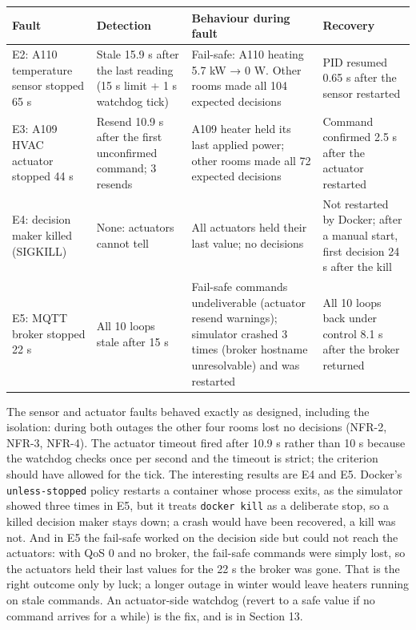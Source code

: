 \documentclass[11pt]{article}
\makeatletter
\DeclareRobustCommand{\_}{\ifmmode\nfss@text{\textunderscore}\else\textunderscore\allowbreak\fi}
\makeatother
\begin{document}
\begin{longtable}[]{@{}
  >{\raggedright\arraybackslash}p{}
  >{\raggedright\arraybackslash}p{}
  >{\raggedright\arraybackslash}p{}
  >{\raggedright\arraybackslash}p{}@{}}
\toprule
\textbf{Fault} & \textbf{Detection} & \textbf{Behaviour during fault} & \textbf{Recovery} \\
\midrule
\endhead
E2: A110 temperature sensor stopped 65 s & Stale 15.9 s after the last reading (15 s limit + 1 s watchdog tick) & Fail-safe: A110 heating 5.7 kW → 0 W. Other rooms made all 104 expected decisions & PID resumed 0.65 s after the sensor restarted \\
E3: A109 HVAC actuator stopped 44 s & Resend 10.9 s after the first unconfirmed command; 3 resends & A109 heater held its last applied power; other rooms made all 72 expected decisions & Command confirmed 2.5 s after the actuator restarted \\
E4: decision maker killed (SIGKILL) & None: actuators cannot tell & All actuators held their last value; no decisions & Not restarted by Docker; after a manual start, first decision 24 s after the kill \\
E5: MQTT broker stopped 22 s & All 10 loops stale after 15 s & Fail-safe commands undeliverable (actuator resend warnings); simulator crashed 3 times (broker hostname unresolvable) and was restarted & All 10 loops back under control 8.1 s after the broker returned \\
\bottomrule
\end{longtable}

The sensor and actuator faults behaved exactly as designed, including the
isolation: during both outages the other four rooms lost no decisions (NFR-2,
NFR-3, NFR-4). The actuator timeout fired after 10.9 s rather than 10 s because
the watchdog checks once per second and the timeout is strict; the criterion
should have allowed for the tick. The interesting results are E4 and E5. Docker's
\texttt{unless-stopped} policy restarts a container whose process exits, as the
simulator showed three times in E5, but it treats \texttt{docker kill} as a
deliberate stop, so a killed decision maker stays down; a crash would have been
recovered, a kill was not. And in E5 the fail-safe worked on the decision side
but could not reach the actuators: with QoS 0 and no broker, the fail-safe
commands were simply lost, so the actuators held their last values for the 22 s
the broker was gone. That is the right outcome only by luck; a longer outage in
winter would leave heaters running on stale commands. An actuator-side watchdog
(revert to a safe value if no command arrives for a while) is the fix, and is in
Section 13.
\end{document}

